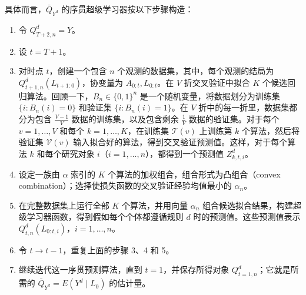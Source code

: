 具体而言，$\bar Q_{Y^d}$ 的序贯超级学习器按以下步骤构造：
\begin{enumerate}[itemsep=.5em]
 \item 令 $Q^d_{T+2,n}=Y$。
 \item 设 $t=T+1$。
 \item 对时点 $t$，创建一个包含 $n$ 个观测的数据集，其中，每个观测的结局为 $Q^d_{t+1,n}(L_{t+1:0})$，协变量为 $A_{0:t},L_{0:t}$。在 $V$ 折交叉验证中拟合 $K$ 个候选回归算法。回顾一下，$B_n\in\{0,1\}^n$ 是一个随机变量，将数据划分为训练集 $\{i:B_n(i)=0\}$ 和验证集 $\{i:B_n(i)=1\}$。在 $V$ 折中的每一折里，数据集都分为包含 $\frac{V-1}{V}$ 数据的训练集，以及包含剩余 $\frac1V$ 数据的验证集。对于每个 $v=1,\ldots,V$ 和每个 $k=1,\ldots,K$，在训练集 $\mathcal T(v)$ 上训练第 $k$ 个算法，然后将验证集 $\mathcal V(v)$ 输入拟合好的算法，得到交叉验证预测值。这样，对于每个算法 $k$ 和每个研究对象 $i$（$i=1,\ldots,n$），都得到一个预测值 $Z^d_{k,t,i}$。

 \begin{center}
  
 \end{center}

 \item 设定一族由 $\alpha$ 索引的 $K$ 个算法的加权组合，组合形式为凸组合（convex combination）；选择使损失函数的交叉验证经验均值最小的 $\alpha_n$。
 \item 在完整数据集上运行全部 $K$ 个算法，并用向量 $\alpha_n$ 组合候选拟合结果，构建超级学习器函数，得到假如每个个体都遵循规则 $d$ 时的预测值。这些预测值表示 $Q^d_{t,n}(L_{0:t,i})$，$i=1,\ldots,n$。

 \begin{center}
  
 \end{center}

 \item 令 $t\to t-1$，重复上面的步骤 3、4 和 5。
 \item 继续迭代这一序贯预测算法，直到 $t=1$，并保存所得对象 $Q^d_{t=1,n}$；它就是所需的 $\bar Q_{Y^d}=E(Y^d\mid L_0)$ 的估计量。
\end{enumerate}
